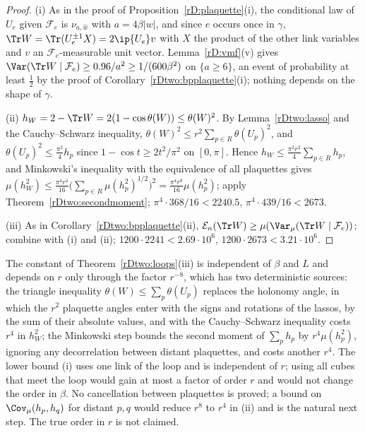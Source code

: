 \begin{proof}
(i) As in the proof of Proposition~\ref{rD:plaquette}(i), the conditional
law of $U_e$ given $\mathcal F_e$ is $\nu_{a,\hat w}$ with $a=4\beta\lvert w
\rvert$, and since $e$ occurs once in $\gamma$, $\Tr W=\Tr(U_e^{\pm1}X)=
2\ip{U_e}v$ with $X$ the product of the other link variables and $v$ an
$\mathcal F_e$-measurable unit vector. Lemma~\ref{rD:vmf}(v) gives $\Var(\Tr W
\mid\mathcal F_e)\ge0.96/a^2\ge1/(600\beta^2)$ on $\{a\ge6\}$, an event of
probability at least $\frac12$ by the proof of
Corollary~\ref{rDtwo:bpplaquette}(i); nothing depends on the shape of
$\gamma$.

(ii) $h_W=2-\Tr W=2(1-\cos\theta(W))\le\theta(W)^2$. By
Lemma~\ref{rDtwo:lasso} and the Cauchy--Schwarz inequality, $\theta(W)^2\le
r^2\sum_{p\in R}\theta(U_p)^2$, and $\theta(U_p)^2\le\frac{\pi^2}4h_p$ since
$1-\cos t\ge2t^2/\pi^2$ on $[0,\pi]$. Hence $h_W\le\frac{\pi^2r^2}4\sum_{p
\in R}h_p$, and Minkowski's inequality with the equivalence of all
plaquettes gives $\mu(h_W^2)\le\frac{\pi^4r^4}{16}\bigl(\sum_{p\in R}\mu(h_p^2)
^{1/2}\bigr)^2=\frac{\pi^4r^8}{16}\mu(h_p^2)$; apply
Theorem~\ref{rDtwo:secondmoment}; $\pi^4\cdot368/16<2240.5$, $\pi^4\cdot439/16
<2673$.

(iii) As in Corollary~\ref{rDtwo:bpplaquette}(ii), $\mathcal E_n(\Tr W)\ge\mu(
\Var_\mu(\Tr W\mid\mathcal F_e))$; combine with (i) and (ii); $1200\cdot2241<
2.69\cdot10^6$, $1200\cdot2673<3.21\cdot10^6$.
\end{proof}

\begin{remark}\label{rDtwo:loss}
The constant of Theorem~\ref{rDtwo:loops}(iii) is independent of $\beta$
and $L$ and depends on $r$ only through the factor $r^{-8}$, which has two
deterministic sources: the triangle inequality $\theta(W)\le\sum_p\theta(U_p)$
replaces the holonomy angle, in which the $r^2$ plaquette angles enter with
the signs and rotations of the lassos, by the sum of their absolute values,
and with the Cauchy--Schwarz inequality costs $r^4$ in $h_W^2$; the
Minkowski step bounds the second moment of $\sum_ph_p$ by $r^4\mu(h_p^2)$,
ignoring any decorrelation between distant plaquettes, and costs another
$r^4$. The lower bound (i) uses one link of the loop and is independent of
$r$; using all cubes that meet the loop would gain at most a factor of order
$r$ and would not change the order in $\beta$. No cancellation between
plaquettes is proved; a bound on $\Cov_\mu(h_p,h_q)$ for distant $p,q$ would
reduce $r^8$ to $r^4$ in (ii) and is the natural next step. The true order
in $r$ is not claimed.
\end{remark}

